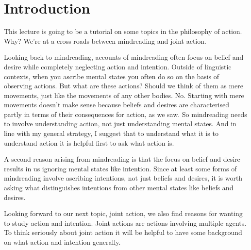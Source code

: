 \documentclass[12pt,\papersize]{extarticle}
\begin{document}
\setlength\footnotesep{1em}




\maketitle
%
%
%



\section{Introduction}
This  lecture is going to be a tutorial on some topics in the philosophy of action.
Why?
We’re at a cross-roads between mindreading and joint action.

Looking back to mindreading, accounts of mindreading often focus on belief and desire while completely neglecting action and intention.
Outside of linguistic contexts, when you ascribe mental states you often do so on the basis of observing actions.
But what are these actions?  Should we think of them as mere movements, just like the movements of any other bodies. 
No.
Starting with mere movements doesn't make sense because beliefs and desires are characterised partly in terms of their consequences for action, as we saw.
So mindreading needs to involve understanding action, not just understanding mental states.
And in line with my general strategy, I suggest that to understand what it is to understand action it is helpful first to ask what action is.

A second reason arising from mindreading is that the focus on belief and desire results in us ignoring mental states like intention.
Since at least some forms of mindreading involve ascribing intentions, not just beliefs and desires, it is worth asking what distinguishes intentions from other mental states like beliefs and desires.

Looking forward to our next topic, joint action, we also find reasons for wanting to study action and intention.
Joint actions are actions involving multiple agents.
To think seriously about joint action it will be helpful to have some background on what action and intention generally.
\end{document}
